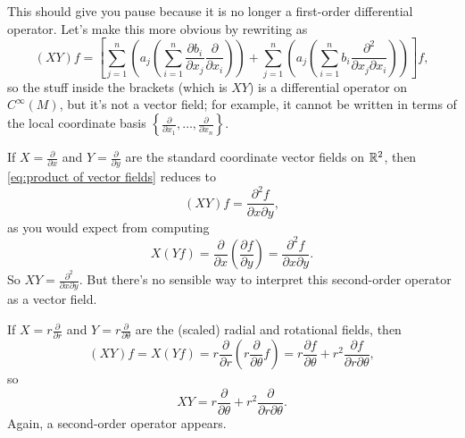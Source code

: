 This should give you pause because it is no longer a first-order differential operator. Let's make this more obvious by rewriting as
\begin{equation}\label{eq:product of vector fields}
	(XY)f = \left[ \sum_{j=1}^n \left(a_j \left( \sum_{i=1}^n \frac{\partial b_i}{\partial x_j} \frac{\partial}{\partial x_i}\right)\right) + \sum_{j=1}^n \left(a_j \left(\sum_{i=1}^n b_i \frac{\partial^2}{\partial x_j \partial x_i}\right)\right)\right]f,
\end{equation}
so the stuff inside the brackets (which is $XY$) is a differential operator on $C^\infty(M)$, but it's not a vector field; for example, it cannot be written in terms of the local coordinate basis $\left\{ \frac{\partial}{\partial x_1}, \dots , \frac{\partial}{\partial x_n}\right\}$.

\begin{example}
	If $X = \frac{\partial}{\partial x}$ and $Y = \frac{\partial}{\partial y}$ are the standard coordinate vector fields on $\mathbb{R}^2$, then \eqref{eq:product of vector fields} reduces to
	\[
		(XY)f = \frac{\partial^2 f}{\partial x \partial y},
	\]
	as you would expect from computing
	\[
		X(Yf) = \frac{\partial}{\partial x} \left( \frac{\partial f}{\partial y}\right) = \frac{\partial^2 f}{\partial x \partial y}.
	\]
	So $XY = \frac{\partial^2}{\partial x \partial y}$. But there's no sensible way to interpret this second-order operator as a vector field.
\end{example}

\begin{example}\label{ex:radial and rotational fields}
	If $X = r \frac{\partial}{\partial r}$ and $Y = r \frac{\partial}{\partial \theta}$ are the (scaled) radial and rotational fields, then
	\[
		(XY)f = X(Yf) = r \frac{\partial }{\partial r} \left( r \frac{\partial}{\partial \theta}f \right) = r \frac{\partial f}{\partial \theta} + r^2 \frac{\partial f}{\partial r \partial \theta},
	\]
	so
	\[
		XY = r \frac{\partial}{\partial \theta} + r^2 \frac{\partial}{\partial r \partial \theta}.
	\]
	Again, a second-order operator appears.
\end{example}

